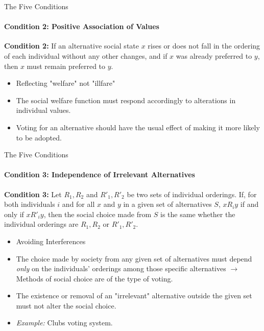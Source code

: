 \documentclass{beamer}
\begin{document}
\begin{frame}{The Five Conditions}
    \framesubtitle{Condition 2: Positive Association of Values}
    \textbf{Condition 2:} If an alternative social state $x$ rises or does not fall in the ordering of each individual without any other changes, and if $x$ was already preferred to $y$, then $x$ must remain preferred to $y$.
    \begin{itemize}
        \item[$\Rightarrow$] Reflecting "welfare" not "illfare"
    \end{itemize}
    \vspace{0.5 cm}
    \begin{itemize}
        \item The social welfare function must respond accordingly to alterations in individual values.
        \item Voting for an alternative should have the usual effect of making it more likely to be adopted.
    \end{itemize}
\end{frame}

\begin{frame}{The Five Conditions}
    \framesubtitle{Condition 3: Independence of Irrelevant Alternatives}
    \textbf{Condition 3:} Let $R_1, R_2$ and $R'_1, R'_2$ be two sets of individual orderings. If, for both individuals $i$ and for all $x$ and $y$ in a given set of alternatives $S$, $xR_iy$ if and only if $xR'_iy$, then the social choice made from $S$ is the same whether the individual orderings are $R_1, R_2$ or $R'_1, R'_2$.
    \begin{itemize}
        \item[$\Rightarrow$] Avoiding Interferences
    \end{itemize}
    \vspace{0.5 cm}
    \begin{itemize}
        \item The choice made by society from any given set of alternatives must depend \textit{only} on the individuals' orderings among those specific alternatives $\rightarrow$ Methods of social choice are of the type of voting.
        \item The existence or removal of an "irrelevant" alternative outside the given set must not alter the social choice.
        \item \textit{Example:} Clubs voting system.
    \end{itemize}

    
\end{frame}
\end{document}

